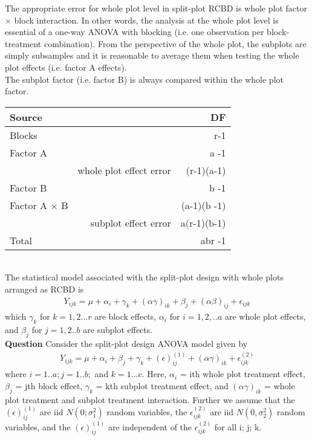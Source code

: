 \documentclass{homework}
\begin{document}
The appropriate error for whole plot level in split-plot RCBD is whole plot factor $\times$ block interaction. In other words, the analysis at the whole plot level is essential of a one-way ANOVA with blocking (i.e. one observation per block-treatment combination). From the perspective of the whole plot, the subplots are simply subsamples and it is reasonable to average them when testing the whole plot effects (i.e. factor A effects).\\
The subplot factor (i.e. factor B) is always compared within the whole plot factor. \\
\begin{tabular}{l r r}
Source & & DF  \\\hline
Blocks &  &r-1\\
Factor 	A & & a -1\\
 & whole plot effect error  & (r-1)(a-1)\\
Factor B & & b -1\\
Factor A $\times$ B &  & (a-1)(b -1)\\
 & subplot effect error  & a(r-1)(b-1)\\
Total &   & abr -1\\
\hline
\end{tabular}\\
The statistical model associated with the split-plot design with whole plots arranged as RCBD is 
\begin{align*}
Y_{ijk} = \mu + \alpha_i + \gamma_k + (\alpha\gamma)_{ik} + \beta_j + (\alpha\beta)_{ij} + \epsilon_{ijk}
\end{align*}
which $\gamma_k$ for $k=1,2...r$ are block effects, $\alpha_i$ for $i=1,2,.. a$ are whole plot effects, and $\beta_j$ for $j=1,2..b$ are subplot effects. \\

\textbf{Question} Consider the split-plot design ANOVA model given by
\begin{align*}
Y_{ijk} = \mu + \alpha_i + \beta_j + \gamma_k  + (\epsilon)_{ij}^{(1)}  + (\alpha\gamma)_{ik}+ \epsilon_{ijk}^{(2)}
\end{align*}
where $i = 1.. a; j = 1.. b;$ and $k = 1... c$. Here, $\alpha_i$ = ith whole plot treatment effect, $\beta_j$ = jth block effect, $\gamma_k$ = kth subplot treatment effect, and $(\alpha\gamma)_{ik}$ = whole plot treatment and subplot treatment interaction. Further we assume that the $(\epsilon)_{ij}^{(1)}$ are iid $N(0; \sigma_1^2)$ random variables, the $\epsilon_{ijk}^{(2)}$ are iid $N(0, \sigma_2^2)$ random variables, and the $(\epsilon)_{ij}^{(1)}$ are independent of the $\epsilon_{ijk}^{(2)}$ for all i; j; k.\\
\end{document}
